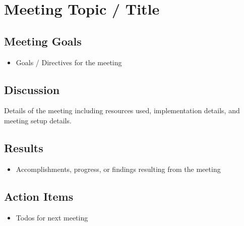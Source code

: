 \section{Meeting Topic / Title}

\subsection{Meeting Goals}
\begin{itemize}
    \item Goals / Directives for the meeting
\end{itemize}

\subsection{Discussion}
Details of the meeting including resources used, implementation details, and meeting setup details.

\subsection{Results}
\begin{itemize}
    \item Accomplishments, progress, or findings resulting from the meeting
\end{itemize}

\subsection{Action Items}
\begin{itemize}
    \item Todos for next meeting
\end{itemize}